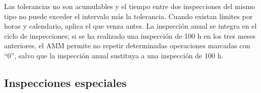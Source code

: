 \documentclass[12pt]{article}
\begin{document}
Las tolerancias no son acumulables y el tiempo entre dos inspecciones del mismo tipo no puede exceder el intervalo más la tolerancia. Cuando existan límites por horas y calendario, aplica el que venza antes. La inspección anual se integra en el ciclo de inspecciones; si se ha realizado una inspección de 100 h en los tres meses anteriores, el AMM permite no repetir determinadas operaciones marcadas con ``0'', salvo que la inspección anual sustituya a una inspección de 100 h.

\subsection{Inspecciones especiales}
\label{subsec:inspecciones-especiales}

\begingroup
\scriptsize
\setlength{\tabcolsep}{3pt}
\renewcommand{\arraystretch}{1.18}
\end{document}
